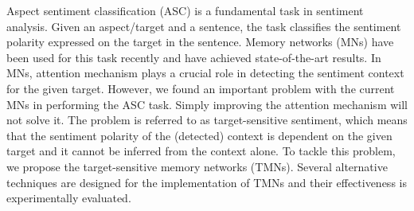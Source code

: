 Aspect sentiment classification (ASC) is a fundamental task in sentiment analysis. Given an aspect/target and a sentence, the task classifies the sentiment polarity expressed on the target in the sentence. Memory networks (MNs) have been used for this task recently and have achieved state-of-the-art results. In MNs, attention mechanism plays a crucial role in detecting the sentiment context for the given target. However, we found an important problem with the current MNs in performing the ASC task. Simply improving the attention mechanism will not solve it. The problem is referred to as target-sensitive sentiment, which means that the sentiment polarity of the (detected) context is dependent on the given target and it cannot be inferred from the context alone. To tackle this problem, we propose the target-sensitive memory networks (TMNs). Several alternative techniques are designed for the implementation of TMNs and their effectiveness is experimentally evaluated.
